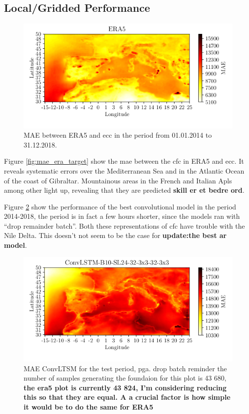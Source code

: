 \subsection{Local/Gridded Performance}
\begin{figure}
    \centering
    \includegraphics{python_figs/mae_era_vs_target_test_period_2014_to_2018.png}
    \caption{MAE between ERA5 and \acrshort{ecc} in the period from 01.01.2014 to 31.12.2018.}
    \label{fig:MAE_era}
\end{figure}
Figure \ref{fig:mae_era_target} show the \acrshort{mae} between the \acrshort{cfc} in ERA5 and \acrshort{ecc}. It reveals systematic errors over the Mediterranean Sea and in the Atlantic Ocean of the coast of Gibraltar. Mountainous areas in the French and Italian Apls
among other light up, revealing that they are predicted \textbf{skill er et bedre ord}. 


Figure \ref{fig:MAE_convlstm} show the performance of the best convolutional model in the period 2014-2018, the period is in fact a few hours shorter, since the models ran with ``drop remainder batch''. Both these representations of \acrshort{cfc} have trouble with the Nile Delta. This doesn't not seem to be the case for \textbf{update:the best ar model}.
\begin{figure}
    \centering
    \includegraphics{python_figs/mae_convlstm_vs_target_test_period_2014_to_2018.png}
    \caption{MAE ConvLTSM for the test period, pga. drop batch reminder the number of samples generating the foundaion for this plot is 43 680, \textbf{the era5 plot is currently 43 824, I'm considering reducing this so that they are equal. A a crucial factor is how simple it would be to do the same for ERA5} }
    \label{fig:MAE_convlstm}
\end{figure}

